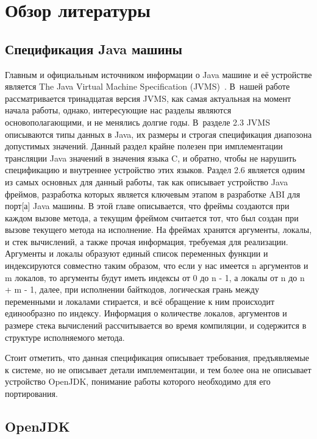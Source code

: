 \section*{Обзор литературы}

\subsection*{Спецификация Java машины}

Главным и официальным источником информации о Java машине и её устройстве является The Java Virtual Machine Specification (JVMS)~\cite{jvms}. В~нашей работе рассматривается тринадцатая версия JVMS, как самая актуальная на момент начала работы, однако, интересующие нас разделы являются основополагающими, и не менялись долгие годы. 
В~разделе 2.3 JVMS описываются типы данных в Java, их размеры и строгая спецификация диапозона допустимых значений. Данный раздел крайне полезен при имплементации трансляции Java значений в значения языка C, и обратно, чтобы не нарушить спецификацию и внутреннее устройство этих языков. Раздел 2.6 является одним из самых основных для данный работы, так как описывает устройство Java фреймов, разработка которых является ключевым этапом в разработке ABI для \gls{порт}[а] Java машины. В этой главе описывается, что фреймы создаются при каждом вызове метода, а текущим фреймом считается тот, что был создан при вызове текущего метода на исполнение. На фреймах хранятся аргументы, локалы, и стек вычислений, а также прочая информация, требуемая для реализации. Аргументы и локалы образуют единый список переменных функции и индексируются совместно таким образом, что если у нас имеется n аргументов и m локалов, то аргументы будут иметь индексы от 0 до n - 1, а локалы от n до n + m - 1, далее, при исполнении байткодов, логическая грань между переменными и локалами стирается, и всё обращение к ним происходит единообразно по индексу. Информация о количестве локалов, аргументов и размере стека вычислений рассчитывается во время компиляции, и содержится в структуре исполняемого метода.

Стоит отметить, что данная спецификация описывает требования, предъявляемые к системе, но не описывает детали имплементации, и тем более она не описывает устройство OpenJDK, понимание работы которого необходимо для его портирования.


\subsection*{OpenJDK}

